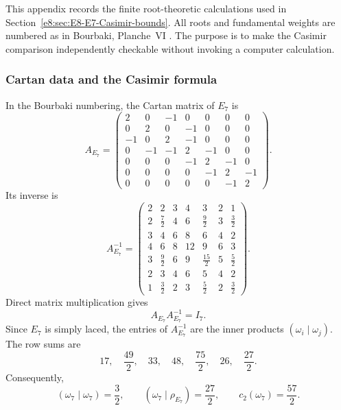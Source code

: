 \documentclass[11pt,reqno]{amsart}
\theoremstyle{definition}
\theoremstyle{remark}
\begin{document}
This appendix records the finite root-theoretic calculations used in
Section~\ref{e8:sec:E8-E7-Casimir-bounds}.  All roots and fundamental weights
are numbered as in Bourbaki, Planche~VI \cite{Bourbaki2002}.  The purpose is
to make the Casimir comparison independently checkable without invoking a
computer calculation.

\subsubsection{Cartan data and the Casimir formula}


In the Bourbaki numbering, the Cartan matrix of $E_{7}$ is
\begin{equation*}
 A_{E_7}
 =\begin{pmatrix}
 2&0&-1&0&0&0&0\\
 0&2&0&-1&0&0&0\\
 -1&0&2&-1&0&0&0\\
 0&-1&-1&2&-1&0&0\\
 0&0&0&-1&2&-1&0\\
 0&0&0&0&-1&2&-1\\
 0&0&0&0&0&-1&2
 \end{pmatrix}.
\end{equation*}
Its inverse is
\begin{equation*}
 A_{E_7}^{-1}
 =\begin{pmatrix}
 2&2&3&4&3&2&1\\
 2&\frac72&4&6&\frac92&3&\frac32\\
 3&4&6&8&6&4&2\\
 4&6&8&12&9&6&3\\
 3&\frac92&6&9&\frac{15}{2}&5&\frac52\\
 2&3&4&6&5&4&2\\
 1&\frac32&2&3&\frac52&2&\frac32
 \end{pmatrix}.
\end{equation*}
Direct matrix multiplication gives
\begin{equation*}
 A_{E_7}A_{E_7}^{-1}=I_7.
\end{equation*}
Since $E_7$ is simply laced, the entries of
$A_{E_7}^{-1}$ are the inner products
$(\omega_i\mid\omega_j)$.  The row sums are
\begin{equation*}
 17,\quad \frac{49}{2},\quad 33,\quad 48,
 \quad \frac{75}{2},\quad 26,\quad \frac{27}{2}.
\end{equation*}
Consequently,
\begin{equation*}
 (\omega_7\mid\omega_7)=\frac32,
 \qquad
 (\omega_7\mid\rho_{E_7})=\frac{27}{2},
 \qquad
 c_2(\omega_7)=\frac{57}{2}.
\end{equation*}
\end{document}
